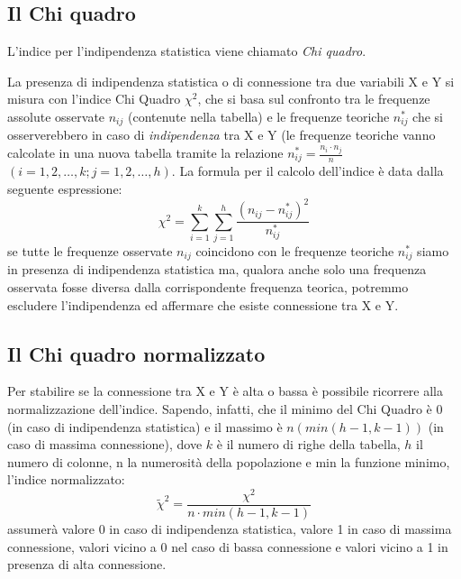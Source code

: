 \subsection{Il Chi quadro}

L'indice per l'indipendenza statistica viene chiamato \emph{Chi quadro}.

La presenza di indipendenza statistica o di connessione tra due variabili X 
e Y si misura con l'indice Chi Quadro \(\chi^2\), che si basa sul confronto 
tra le frequenze assolute osservate  \(n_{ij}\) (contenute nella tabella) e 
le frequenze teoriche \(n^*_{ij}\) che si osserverebbero in caso di 
\emph{indipendenza} tra X e Y (le frequenze teoriche vanno calcolate 
in una nuova tabella  tramite la relazione \(n^*_{ij}=\frac{n_i\cdot 
n_j}{n}\) \((i=1,2,\dots,k; j=1,2,\dots,h)\). La formula per il calcolo 
dell'indice è data dalla seguente espressione: 
\[\chi^2 = \sum_{i=1}^{k}\sum_{j=1}^{h}\frac{\left(n_{ij}-n^*_{ij}\right) 
^2}{n^*_{ij}}\]
se tutte le frequenze osservate \(n_{ij}\) coincidono con le frequenze 
teoriche \(n^*_{ij}\) siamo in presenza di indipendenza statistica ma, 
qualora anche solo una frequenza osservata fosse diversa dalla 
corrispondente frequenza teorica, potremmo escludere l'indipendenza ed 
affermare che esiste connessione tra X e Y.

\subsection{Il Chi quadro normalizzato}

 Per stabilire se la connessione tra X e Y è alta o bassa è possibile 
ricorrere alla normalizzazione dell'indice. Sapendo, infatti, che il minimo 
del Chi Quadro è 0 (in caso di indipendenza statistica) e il massimo è 
\(n(min(h-1,k-1))\)  (in caso di massima connessione), dove \(k\) è il numero 
di righe della tabella, \(h\) il numero di colonne, n la numerosità della 
popolazione e min la funzione minimo, l'indice normalizzato:
 \[\widetilde{\chi}^2=\frac{\chi^2}{n\cdot min(h-1,k-1)}\]
 assumerà valore 0 in caso di indipendenza statistica, valore 1 in caso di 
massima connessione, valori vicino a 0 nel caso di bassa connessione e 
valori vicino a 1 in presenza di alta connessione.


